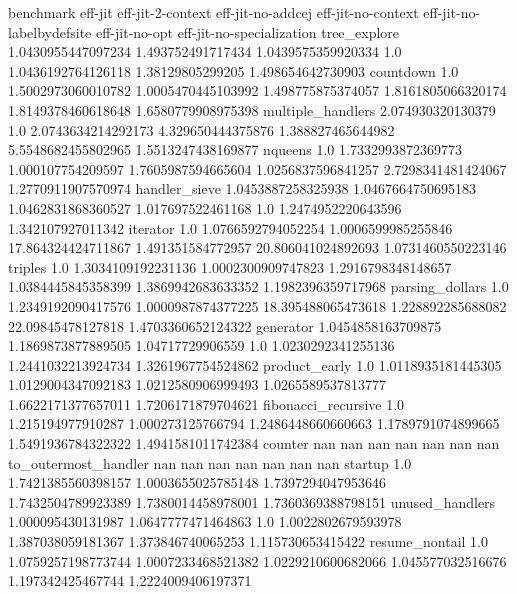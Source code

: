 benchmark	eff-jit	eff-jit-2-context	eff-jit-no-addcej	eff-jit-no-context	eff-jit-no-labelbydefsite	eff-jit-no-opt	eff-jit-no-specialization
tree_explore	1.0430955447097234	1.493752491717434	1.0439575359920334	1.0	1.0436192764126118	1.38129805299205	1.498654642730903
countdown	1.0	1.5002973060010782	1.0005470445103992	1.498775875374057	1.8161805066320174	1.8149378460618648	1.6580779908975398
multiple_handlers	2.074930320130379	1.0	2.0743634214292173	4.329650444375876	1.388827465644982	5.5548682455802965	1.5513247438169877
nqueens	1.0	1.7332993872369773	1.000107754209597	1.7605987594665604	1.0256837596841257	2.7298341481424067	1.2770911907570974
handler_sieve	1.0453887258325938	1.0467664750695183	1.0462831868360527	1.017697522461168	1.0	1.2474952220643596	1.342107927011342
iterator	1.0	1.0766592794052254	1.0006599985255846	17.864324424711867	1.491351584772957	20.806041024892693	1.0731460550223146
triples	1.0	1.3034109192231136	1.0002300909747823	1.2916798348148657	1.0384445845358399	1.3869942683633352	1.1982396359717968
parsing_dollars	1.0	1.2349192090417576	1.0000987874377225	18.395488065473618	1.228892285688082	22.09845478127818	1.4703360652124322
generator	1.0454858163709875	1.1869873877889505	1.04717729906559	1.0	1.0230292341255136	1.2441032213924734	1.3261967754524862
product_early	1.0	1.0118935181445305	1.0129004347092183	1.0212580906999493	1.0265589537813777	1.6622171377657011	1.7206171879704621
fibonacci_recursive	1.0	1.215194977910287	1.000273125766794	1.2486448660660663	1.1789791074899665	1.5491936784322322	1.4941581011742384
counter	nan	nan	nan	nan	nan	nan	nan
to_outermost_handler	nan	nan	nan	nan	nan	nan	nan
startup	1.0	1.7421385560398157	1.0003655025785148	1.7397294047953646	1.7432504789923389	1.7380014458978001	1.7360369388798151
unused_handlers	1.000095430131987	1.0647777471464863	1.0	1.0022802679593978	1.387038059181367	1.373846740065253	1.115730653415422
resume_nontail	1.0	1.0759257198773744	1.0007233468521382	1.0229210600682066	1.045577032516676	1.197342425467744	1.2224009406197371